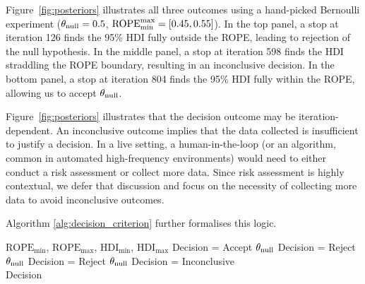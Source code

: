 Figure~\ref{fig:posteriors} illustrates all three outcomes using a hand-picked Bernoulli
experiment ($\theta_{\rm null}=0.5$, ${\rm ROPE}_{\rm min}^{\rm max}=[0.45,0.55]$).
In the top panel, a stop at iteration 126 finds the 95\% HDI fully outside the ROPE, leading to rejection of the null hypothesis.
In the middle panel, a stop at iteration 598 finds the HDI straddling the ROPE boundary, resulting in an inconclusive decision.
In the bottom panel, a stop at iteration 804 finds the 95\% HDI fully within the ROPE, allowing us to accept $\theta_{\rm null}$.

Figure~\ref{fig:posteriors} illustrates that the decision outcome may be iteration-dependent. An inconclusive outcome implies that the data collected is insufficient to justify a decision. In a live setting, a human-in-the-loop (or an algorithm, common in automated high-frequency environments) would need to either conduct a risk assessment or collect more data. Since risk assessment is highly contextual, we defer that discussion and focus on the necessity of collecting more data to avoid inconclusive outcomes.

Algorithm \ref{alg:decision_criterion} further formalises this logic.

\begin{algorithm}
    \caption{The Decision Rule}\label{alg:decision_criterion}
    \begin{algorithmic}
    \Require $\mathrm{ROPE}_\mathrm{min}$, $\mathrm{ROPE}_\mathrm{max}$, $\mathrm{HDI}_\mathrm{min}$, $\mathrm{HDI}_\mathrm{max}$
        \State Decision = Accept $\theta_{\rm null}$ 
        \State Decision = Reject $\theta_{\rm null}$ 
        \State Decision = Reject $\theta_{\rm null}$ 
    \Else
    \State Decision = Inconclusive  
    \EndIf \\
    \Return Decision
    \end{algorithmic} 
\end{algorithm}

%
%
